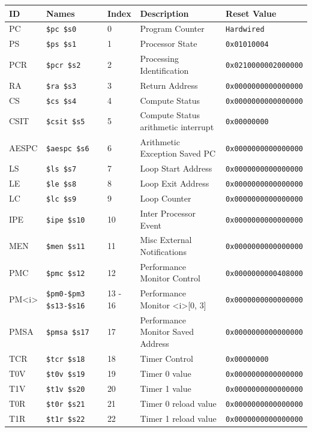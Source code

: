 {\scriptsize
\begin{tabular}{|l|l|l|l|l|} \hline
ID & Names & Index & Description & Reset Value \\ \hline
PC & \verb|$pc $s0| & 0 & Program Counter & \verb|Hardwired| \\
PS & \verb|$ps $s1| & 1 & Processor State & \verb|0x01010004| \\
PCR & \verb|$pcr $s2| & 2 & Processing Identification & \verb|0x0210000002000000| \\
RA & \verb|$ra $s3| & 3 & Return Address & \verb|0x0000000000000000| \\
CS & \verb|$cs $s4| & 4 & Compute Status & \verb|0x0000000000000000| \\
CSIT & \verb|$csit $s5| & 5 & Compute Status arithmetic interrupt & \verb|0x00000000| \\
AESPC & \verb|$aespc $s6| & 6 & Arithmetic Exception Saved PC & \verb|0x0000000000000000| \\
LS & \verb|$ls $s7| & 7 & Loop Start Address & \verb|0x0000000000000000| \\
LE & \verb|$le $s8| & 8 & Loop Exit Address & \verb|0x0000000000000000| \\
LC & \verb|$lc $s9| & 9 & Loop Counter & \verb|0x0000000000000000| \\
IPE & \verb|$ipe $s10| & 10 & Inter Processor Event & \verb|0x0000000000000000| \\
MEN & \verb|$men $s11| & 11 & Misc External Notifications & \verb|0x0000000000000000| \\
PMC & \verb|$pmc $s12| & 12 & Performance Monitor Control & \verb|0x0000000000408000| \\
PM\textless i\textgreater & \verb|$pm0-$pm3 $s13-$s16| & 13 - 16 & Performance Monitor \textless i\textgreater [0, 3] & \verb|0x0000000000000000| \\
PMSA & \verb|$pmsa $s17| & 17 & Performance Monitor Saved Address & \verb|0x0000000000000000| \\
TCR & \verb|$tcr $s18| & 18 & Timer Control & \verb|0x00000000| \\
T0V & \verb|$t0v $s19| & 19 & Timer 0 value & \verb|0x0000000000000000| \\
T1V & \verb|$t1v $s20| & 20 & Timer 1 value & \verb|0x0000000000000000| \\
T0R & \verb|$t0r $s21| & 21 & Timer 0 reload value & \verb|0x0000000000000000| \\
T1R & \verb|$t1r $s22| & 22 & Timer 1 reload value & \verb|0x0000000000000000| \\

\end{tabular}}
